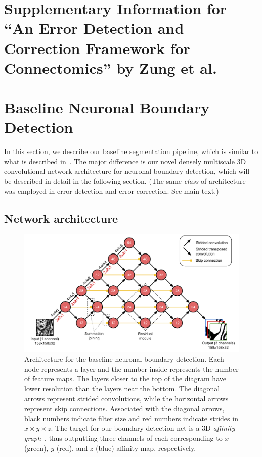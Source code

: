 \documentclass{article}
\begin{document}
\section*{Supplementary Information for ``An Error Detection and Correction Framework for Connectomics'' by Zung et al.}

\appendix
\section{Baseline Neuronal Boundary Detection}
\label{appendix:baseline}

In this section, we describe our baseline segmentation pipeline, which is
similar to what is described in~\cite{kisuk}. The major difference is our novel
densely multiscale 3D convolutional network architecture for neuronal boundary
detection, which will be described in detail in the following section. (The same
\emph{class} of architecture was employed in error detection and error
correction. See main text.)

\subsection{Network architecture}
\label{sec:deltanet}

\begin{figure}[!b]
\centering
\includegraphics[width=1.0\linewidth]{baseline.pdf}

\caption{Architecture for the baseline neuronal boundary detection. Each node
represents a layer and the number inside represents the number of feature maps.
The layers closer to the top of the diagram have lower resolution than the
layers near the bottom. The diagonal arrows represent strided convolutions,
while the horizontal arrows represent skip connections. Associated with the
diagonal arrows, black numbers indicate filter size and red numbers indicate
strides in $x\times y\times z$. The target for our boundary detection net is a
3D \emph{affinity graph}~\cite{boundary_detection,kisuk,funke2017deep}, thus
outputting three channels of each corresponding to $x$ (green), $y$ (red), and
$z$ (blue) affinity map, respectively.}

\label{fig:boundary_detector}
\end{figure}
\end{document}
